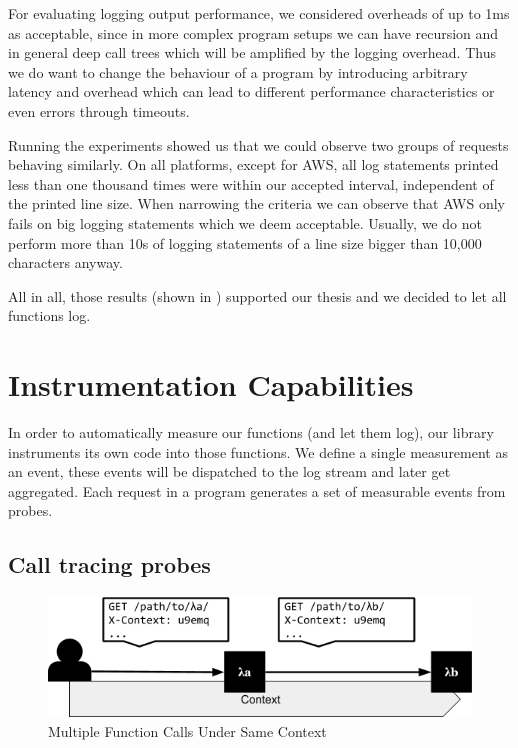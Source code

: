 \documentclass[../main.tex]{subfiles}
\begin{document}
For evaluating logging output performance, we considered overheads of up to 1ms as acceptable, 
since in more complex program setups we can have recursion and in general deep call trees which will be amplified by the logging overhead. 
Thus we do want to change the behaviour of a program by introducing arbitrary latency and 
overhead which can lead to different performance characteristics or even errors through timeouts.

Running the experiments showed us that we could observe two groups of requests behaving similarly. 
On all platforms, except for AWS, 
all log statements printed less than one thousand times were within our accepted interval, independent of the printed line size. 
When narrowing the criteria we can observe that AWS only fails on big logging statements which we deem acceptable.
Usually, we do not perform more than 10s of logging statements of a line size bigger than 10,000 characters anyway.

All in all, those results (shown in ) supported our thesis and we decided to let all functions log.



\section{Instrumentation Capabilities}%
\label{sec:instrumentationCapabilities}

In order to automatically measure our functions (and let them log), our library instruments its own code into those functions.
We define a single measurement as an event, these events will be dispatched to the log stream and later get aggregated. 
Each request in a program generates a set of measurable events from probes.

\subsection{Call tracing probes}%
\label{sub:callTracingProbes}

\begin{figure}
\begin{center}
  \includegraphics[width=\linewidth,keepaspectratio]{./multiple-functions-one-context.png}
\end{center}
\caption{Multiple Function Calls Under Same Context}%
\label{fig:contextID}
\end{figure}
\end{document}
